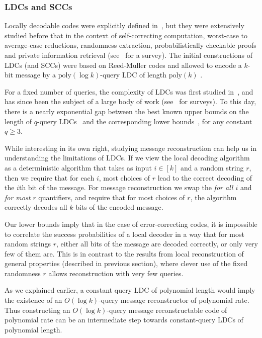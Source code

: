 \documentclass[10pt]{article}
\theoremstyle{definition}
\numberwithin{equation}{section}
\newcommand{\poly}{{\mathrm{poly} }}
\begin{document}
\subsubsection{LDCs and SCCs}

Locally decodable codes were explicitly
defined in~\cite{katz-trevisan}, but they were extensively studied before that in the context of self-correcting computation, worst-case to average-case reductions, randomness extraction,
probabilistically checkable proofs and private information retrieval (see~\cite{trevisan} for a survey).
The initial constructions of
LDCs (and SCCs) were based on Reed-Muller codes and allowed to encode a $k$-bit message by a
$\poly(\log k)$-query LDC of length $\poly(k)$ \cite{bfls,CGKS}.

For a fixed number of queries, the complexity of LDCs was first studied
in~\cite{katz-trevisan}, and has since been the subject of a large body of work
(see~\cite{trevisan, gasarch} for surveys). To this day, there is a nearly exponential gap between the
best known upper bounds on the length of $q$-query LDCs~\cite{Yek,efremenko} and the corresponding lower bounds~\cite{kdw,wdw,woodruff}, for any constant $q \geq 3$.

While interesting 
%
in its own right,
studying message reconstruction can help us in understanding the limitations
of LDCs. If we view the local decoding algorithm as a deterministic algorithm that takes as input $i \in [k]$ and
a random string $r$, then we require that for each $i$, most choices of $r$
lead to the correct decoding of the $i$th bit of the message.
For message reconstruction we swap the \emph{for all $i$} and \emph{for most $r$} quantifiers, and
require that for most choices of $r$, the algorithm correctly decodes all $k$ bits of the encoded message.

Our lower bounds imply that in the case of error-correcting codes, it is impossible to correlate the success probabilities of a local decoder in a way that for most random strings $r$, either all bits of the message are decoded correctly, or only very few of them are. This is in contrast to the results from local reconstruction of general properties (described in previous section), where clever use of the fixed randomness $r$ allows reconstruction with very few queries.

As we explained earlier, a constant query LDC of polynomial length would imply the existence of an $O(\log k)$-query
message reconstructor of polynomial rate. Thus constructing an $O(\log k)$-query message reconstructable code of
polynomial rate can be an intermediate step towards
constant-query LDCs of polynomial length.
\end{document}
